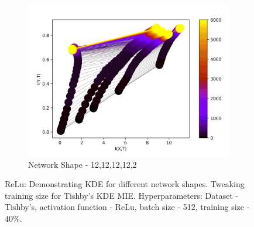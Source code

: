 \documentclass[dissertation.tex]{subfiles}
\begin{document}
\begin{figure}[ht]
\begin{subfigure}[t]{0.32\textwidth}
    \centering
    \includegraphics[width=\textwidth]{figs/eval/networkShapeRelu/KDE3.jpg}
    \caption{
      Network Shape - 12,12,12,12,2
    }
  \end{subfigure}
  \hfill
  \caption{
      ReLu: Demonstrating KDE for different network shapes.  Tweaking training
      size for Tishby's KDE MIE. Hyperparameters: Dataset - Tishby's, activation
      function - ReLu, batch size - 512, training size - 40\%.
    }
  \label{figNetworkShapesReLuAA}
\end{figure}
\end{document}
